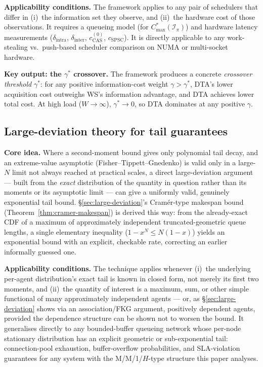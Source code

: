 \documentclass[11pt,a4paper]{report}
\begin{document}
\medskip
\noindent\textbf{Applicability conditions.}
The framework applies to any pair of schedulers that differ in
(i)~the information set they observe, and
(ii)~the hardware cost of those observations.
It requires a queueing model (for $C_{\max}^*(\mathcal{I}_\pi)$) and
hardware latency measurements ($\delta_{\mathrm{intra}}$,
$\delta_{\mathrm{inter}}$, $c_{\mathrm{CAS}}^{(0)}$, $c_{\mathrm{SPSC}}$).
It is directly applicable to any work-stealing vs.\ push-based scheduler
comparison on NUMA or multi-socket hardware.

\medskip
\noindent\textbf{Key output: the $\gamma^*$ crossover.}
The framework produces a concrete \emph{crossover threshold} $\gamma^*$:
for any positive information-cost weight $\gamma > \gamma^*$, DTA's lower
acquisition cost outweighs WS's information advantage, and DTA achieves
lower total cost.  At high load ($W \to \infty$), $\gamma^* \to 0$, so
DTA dominates at any positive $\gamma$.

\subsection{Large-deviation theory for tail guarantees}

\medskip
\noindent\textbf{Core idea.}
Where a second-moment bound gives only polynomial tail decay, and an
extreme-value asymptotic (Fisher--Tippett--Gnedenko) is valid only in a
large-$N$ limit not always reached at practical scales, a direct
large-deviation argument --- built from the \emph{exact} distribution
of the quantity in question rather than its moments or its asymptotic
limit --- can give a uniformly valid, genuinely exponential tail bound.
\S\ref{sec:large-deviation}'s Cram\'er-type makespan bound
(Theorem~\ref{thm:cramer-makespan}) is derived this way: from the
already-exact CDF of a maximum of approximately independent
truncated-geometric queue lengths, a single elementary inequality
($1-x^N \leq N(1-x)$) yields an exponential bound with an explicit,
checkable rate, correcting an earlier informally guessed one.

\medskip
\noindent\textbf{Applicability conditions.}
The technique applies whenever (i)~the underlying per-agent
distribution's exact tail is known in closed form, not merely its
first two moments, and (ii)~the quantity of interest is a maximum,
sum, or other simple functional of many approximately independent
agents --- or, as \S\ref{sec:large-deviation} shows via an
association/FKG argument, positively dependent agents, provided the
dependence structure can be shown not to worsen the bound. It
generalises directly to any bounded-buffer queueing network whose
per-node stationary distribution has an explicit geometric or
sub-exponential tail: connection-pool exhaustion, buffer-overflow
probabilities, and SLA-violation guarantees for any system with the
M/M/1/$H$-type structure this paper analyses.
\end{document}
